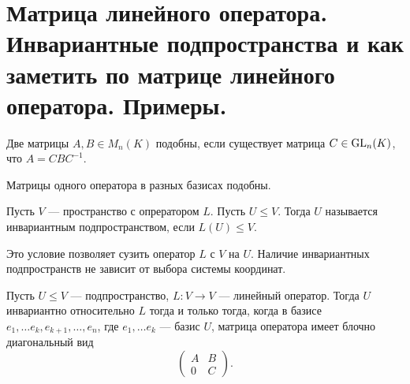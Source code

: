 \section{Матрица линейного оператора. Инвариантные подпространства и как заметить по матрице линейного оператора. Примеры.}
\begin{defn}
    Две матрицы $ A, B \in M_n(K)$ {\sf   подобны}, если существует матрица $ C \in {\mathop{\text{\rm GL}}}_n(K)$, что $ A = CBC^{-1}$.
    \begin{note}
        Матрицы одного оператора в разных базисах подобны.
    \end{note}
\end{defn}
\begin{defn}
    Пусть $ V$ --- пространство с опрератором $ L$. Пусть  $ U \le V$. Тогда $ U$ называется  {\sf инвариантным подпространством}, если $ L(U) \le V$.  
    \begin{note}
        Это условие позволяет сузить оператор $ L$ с  $ V$ на  $ U$. Наличие инвариантных подпространств не зависит от выбора системы координат.
    \end{note}
\end{defn}
\begin{lm}
    Пусть $ U \le V$ --- подпространство, $ L\colon V \to  V$ --- линейный оператор. Тогда $ U$ инвариантно относительно $ L$  тогда и только тогда, когда в базисе $ e_1, \ldots e_k, e_{k+1}, \ldots , e_n$, где $ e_1, \ldots e_k$ --- базис $ U$, матрица оператора имеет блочно диагональный вид
     \[
    \begin{pmatrix}
	A&B\\0&C
    \end{pmatrix}
    .\] 
\end{lm}

